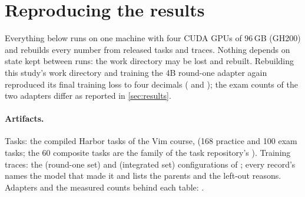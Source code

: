 \section{Reproducing the results}\label{app:repro}
Everything below runs on one machine with four CUDA GPUs of 96\,GB (GH200) and rebuilds every number from released tasks
and traces. Nothing depends on state kept between runs: the work directory may be lost and rebuilt. Rebuilding this
study's work directory and training the 4B round-one adapter again reproduced its final training loss to four decimals
(\replicationLossFirst{} and \replicationLossRebuilt{}); the exam counts of the two adapters differ as reported in
\cref{sec:results}.

\paragraph{Artifacts.} Tasks: the compiled Harbor tasks of the Vim course, 
(168 practice and 100 exam tasks; the 60 composite tasks are the family  of the task repository's
). Training traces: the  (round-one set) and  (integrated set) configurations of
; every record's  names the model that made it
and  lists the parents and the left-out reasons. Adapters and the measured counts behind each table:
.


